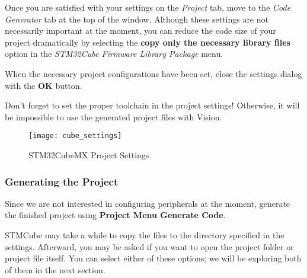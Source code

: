 \documentclass[openany,11pt,fleqn]{book} %
\begin{document}
Once you are satisfied with your settings on the \textit{Project} tab, move to the \textit{Code Generator} tab at the top of the window. Although these settings are not necessarily important at the moment, you can reduce the code size of your project dramatically by selecting the \textbf{copy only the necessary library files} option in the \textit{STM32Cube Firmware Library Package} menu.
 
When the necessary project configurations have been set, close the settings dialog with the \textbf{OK} button. 

\begin{warning}
	Don't forget to set the proper toolchain in the project settings! Otherwise, it will be impossible to use the generated project files with {\textmu}Vision.
\end{warning}

\begin{figure}[h!]
	\centering\texttt{[image: cube\_settings]}
	\caption{STM32CubeMX Project Settings}
	\label{cube_settings}
\end{figure}

\subsubsection*{Generating the Project}
Since we are not interested in configuring peripherals at the moment, generate the finished project using \textbf{Project Menu \textrightarrow Generate Code}. 

STMCube may take a while to copy the files to the directory specified in the settings. Afterward, you may be asked if you want to open the project folder or project file itself. You can select either of these options; we will be exploring both of them in the next section. %
\end{document}
